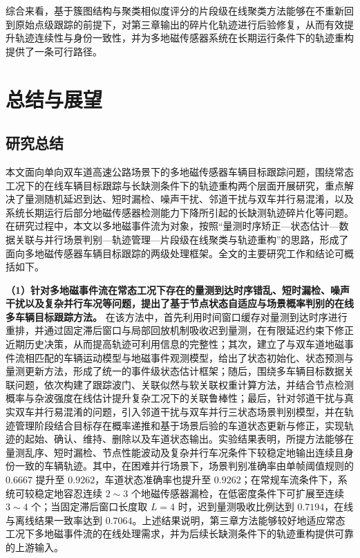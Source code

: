 \documentclass{xdupgthesis}
\begin{document}
综合来看，基于簇图结构与聚类相似度评分的片段级在线聚类方法能够在不重新回到原始点级跟踪的前提下，对第三章输出的碎片化轨迹进行后验修复，从而有效提升轨迹连续性与身份一致性，并为多地磁传感器系统在长期运行条件下的轨迹重构提供了一条可行路径。



\chapter{总结与展望}

\section{研究总结}

本文面向单向双车道高速公路场景下的多地磁传感器车辆目标跟踪问题，围绕常态工况下的在线车辆目标跟踪与长缺测条件下的轨迹重构两个层面开展研究，重点解决了量测随机延迟到达、短时漏检、噪声干扰、邻道干扰与双车并行易混淆，以及系统长期运行后部分地磁传感器检测能力下降所引起的长缺测轨迹碎片化等问题。在研究过程中，本文以多地磁事件流为对象，按照“量测时序矫正—状态估计—数据关联与并行场景判别—轨迹管理—片段级在线聚类与轨迹重构”的思路，形成了面向多地磁传感器车辆目标跟踪的两级处理框架。全文的主要研究工作和结论可概括如下。

\noindent\textbf{（1）针对多地磁事件流在常态工况下存在的量测到达时序错乱、短时漏检、噪声干扰以及复杂并行车况等问题，提出了基于节点状态自适应与场景概率判别的在线多车辆目标跟踪方法。} 在该方法中，首先利用时间窗口缓存对量测到达时序进行重排，并通过固定滞后窗口与局部回放机制吸收迟到量测，在有限延迟约束下修正近期历史决策，从而提高轨迹可利用信息的完整性；其次，建立了与双车道地磁事件流相匹配的车辆运动模型与地磁事件观测模型，给出了状态初始化、状态预测与量测更新方法，形成了统一的事件级状态估计框架；随后，围绕多车辆目标数据关联问题，依次构建了跟踪波门、关联似然与软关联权重计算方法，并结合节点检测概率与杂波强度在线估计提升复杂工况下的关联鲁棒性；最后，针对邻道干扰与真实双车并行易混淆的问题，引入邻道干扰与双车并行三状态场景判别模型，并在轨迹管理阶段结合目标存在概率递推和基于场景后验的车道状态更新与修正，实现轨迹的起始、确认、维持、删除以及车道状态输出。实验结果表明，所提方法能够在量测乱序、短时漏检、节点性能波动及复杂并行车况条件下较稳定地输出连续且身份一致的车辆轨迹。其中，在困难并行场景下，场景判别准确率由单帧阈值规则的 $0.6667$ 提升至 $0.9262$，车道状态准确率也提升至 $0.9262$；在常规车流条件下，系统可较稳定地容忍连续 $2\sim3$ 个地磁传感器漏检，在低密度条件下可扩展至连续 $3\sim4$ 个；当固定滞后窗口长度取 $L=4$ 时，迟到量测吸收比例达到 $0.7194$，在线与离线结果一致率达到 $0.7064$。上述结果说明，第三章方法能够较好地适应常态工况下多地磁事件流的在线处理需求，并为后续长缺测条件下的轨迹重构提供可靠的上游输入。
\end{document}
